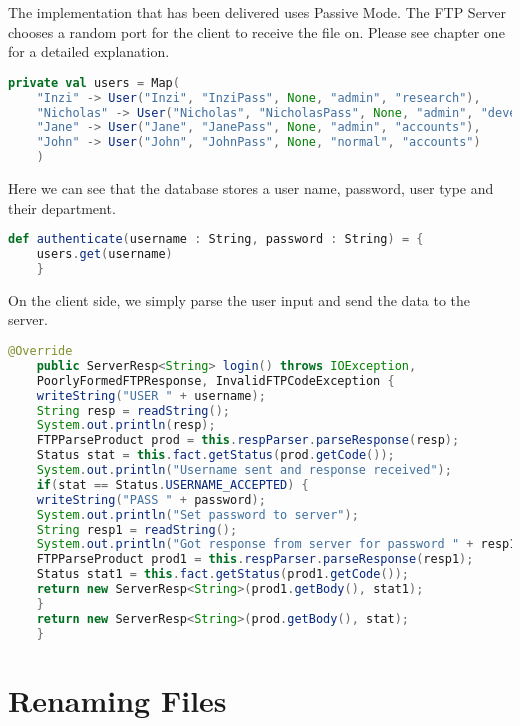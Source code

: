 The implementation that has been delivered uses Passive Mode. The FTP Server chooses a random port for the
client to receive the file on. Please see chapter one for a detailed explanation.

\begin{lstlisting}[language=Scala, caption=Database of users, tabsize=2]
	private val users = Map(
	"Inzi" -> User("Inzi", "InziPass", None, "admin", "research"),
	"Nicholas" -> User("Nicholas", "NicholasPass", None, "admin", "development"),
	"Jane" -> User("Jane", "JanePass", None, "admin", "accounts"),
	"John" -> User("John", "JohnPass", None, "normal", "accounts")
	)

\end{lstlisting}

Here we can see that the database stores a user name, password, user type and their department.

\begin{lstlisting}[language=Scala, caption=Authentication, tabsize=2]
	def authenticate(username : String, password : String) = {
	users.get(username)
	}

\end{lstlisting}

\newpage
On the client side, we simply parse the user input and send the data to the server.
\begin{lstlisting}[language=Java, caption=Send authentication data to the server, showstringspaces=false, tabsize=2]
	@Override
	public ServerResp<String> login() throws IOException,
	PoorlyFormedFTPResponse, InvalidFTPCodeException {
	writeString("USER " + username);
	String resp = readString();
	System.out.println(resp);
	FTPParseProduct prod = this.respParser.parseResponse(resp);
	Status stat = this.fact.getStatus(prod.getCode());
	System.out.println("Username sent and response received");
	if(stat == Status.USERNAME_ACCEPTED) {
	writeString("PASS " + password);
	System.out.println("Set password to server");
	String resp1 = readString();
	System.out.println("Got response from server for password " + resp1);
	FTPParseProduct prod1 = this.respParser.parseResponse(resp1);
	Status stat1 = this.fact.getStatus(prod1.getCode());
	return new ServerResp<String>(prod1.getBody(), stat1);
	}
	return new ServerResp<String>(prod.getBody(), stat);
	}
\end{lstlisting}
\newpage
\section{Renaming Files}

